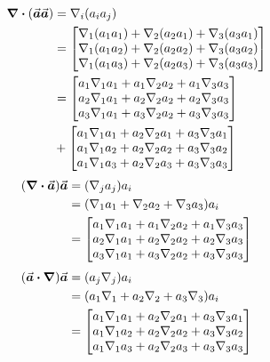 \documentclass[dvipdfmx,autodetect-engine]{article}
\begin{document}
\begin{align}
    \div \pqty{\va*{a} \va*{a}}
    &= \nabla_i \pqty{a_i a_j}
    \\
    &= \mqty[
    \nabla_1 \pqty{a_1 a_1} + \nabla_2 \pqty{a_2 a_1} + \nabla_3 \pqty{a_3 a_1}  \\
    \nabla_1 \pqty{a_1 a_2} + \nabla_2 \pqty{a_2 a_2} + \nabla_3 \pqty{a_3 a_2}   \\
    \nabla_1 \pqty{a_1 a_3} + \nabla_2 \pqty{a_2 a_3} + \nabla_3 \pqty{a_3 a_3}  
    ]
    \\
    &= \mqty[
        a_1 \nabla_1 a_1 + a_1 \nabla_2 a_2 + a_1 \nabla_3 a_3 \\
        a_2 \nabla_1 a_1 + a_2 \nabla_2 a_2 + a_2 \nabla_3 a_3 \\
        a_3 \nabla_1 a_1 + a_3 \nabla_2 a_2 + a_3 \nabla_3 a_3 \\
    ] \\
    &+ \mqty[
        a_1 \nabla_1 a_1 + a_2 \nabla_2 a_1 + a_3 \nabla_3 a_1 \\
        a_1 \nabla_1 a_2 + a_2 \nabla_2 a_2 + a_3 \nabla_3 a_2 \\
        a_1 \nabla_1 a_3 + a_2 \nabla_2 a_3 + a_3 \nabla_3 a_3 \\
    ]
\end{align}
\begin{align}
    \pqty{ \div \va*{a}} \va*{a}
    &= \pqty{\nabla_j a_j} a_i \\
    &= \pqty{\nabla_1 a_1 + \nabla_2 a_2 + \nabla_3 a_3} a_i \\
    &= \mqty[
        a_1 \nabla_1 a_1 + a_1 \nabla_2 a_2 + a_1 \nabla_3 a_3 \\
        a_2 \nabla_1 a_1 + a_2 \nabla_2 a_2 + a_2 \nabla_3 a_3 \\
        a_3 \nabla_1 a_1 + a_3 \nabla_2 a_2 + a_3 \nabla_3 a_3 \\
    ]
\end{align}
\begin{align}
    \pqty{\va*{a} \vdot \grad} \va*{a}
    &= \pqty{a_j \nabla_j} a_i \\
    &= \pqty{a_1 \nabla_1 + a_2 \nabla_2 + a_3 \nabla_3} a_i \\
    &= \mqty[
        a_1 \nabla_1 a_1 + a_2 \nabla_2 a_1 + a_3 \nabla_3 a_1 \\
        a_1 \nabla_1 a_2 + a_2 \nabla_2 a_2 + a_3 \nabla_3 a_2 \\
        a_1 \nabla_1 a_3 + a_2 \nabla_2 a_3 + a_3 \nabla_3 a_3 \\
    ]
\end{align}
\end{document}
